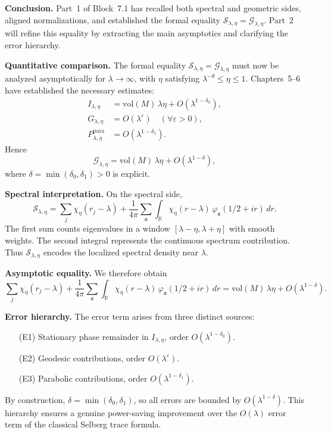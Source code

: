 \medskip

\noindent\textbf{Conclusion.}
Part~1 of Block~7.1 has recalled both spectral and geometric sides, aligned normalizations, and established the formal equality $\mathcal{S}_{\lambda,\eta}=\mathcal{G}_{\lambda,\eta}$.  
Part~2 will refine this equality by extracting the main asymptotics and clarifying the error hierarchy.



\noindent\textbf{Quantitative comparison.}
The formal equality $\mathcal{S}_{\lambda,\eta}=\mathcal{G}_{\lambda,\eta}$ must now be analyzed asymptotically for $\lambda\to\infty$, with $\eta$ satisfying $\lambda^{-\theta}\leq\eta\leq 1$.  
Chapters~5–6 have established the necessary estimates:
\begin{align*}
  I_{\lambda,\eta} &= \mathrm{vol}(M)\,\lambda\eta + O(\lambda^{1-\delta_0}), \\
  G_{\lambda,\eta} &= O(\lambda^\varepsilon) \quad (\forall \varepsilon>0), \\
  P_{\lambda,\eta}^{\mathrm{para}} &= O(\lambda^{1-\delta_1}).
\end{align*}
Hence
\[
  \mathcal{G}_{\lambda,\eta}
  = \mathrm{vol}(M)\,\lambda\eta + O(\lambda^{1-\delta}),
\]
where $\delta=\min(\delta_0,\delta_1)>0$ is explicit.

\medskip

\noindent\textbf{Spectral interpretation.}
On the spectral side,
\[
  \mathcal{S}_{\lambda,\eta} = \sum_j \chi_\eta(r_j-\lambda) + \frac{1}{4\pi}\sum_{\mathfrak{a}}\int_{\mathbb{R}} \chi_\eta(r-\lambda)\,\varphi_\mathfrak{a}(1/2+ir)\, dr.
\]
The first sum counts eigenvalues in a window $[\lambda-\eta,\lambda+\eta]$ with smooth weights.  
The second integral represents the continuous spectrum contribution.  
Thus $\mathcal{S}_{\lambda,\eta}$ encodes the localized spectral density near $\lambda$.

\medskip

\noindent\textbf{Asymptotic equality.}
We therefore obtain
\[
  \sum_j \chi_\eta(r_j-\lambda) + \frac{1}{4\pi}\sum_{\mathfrak{a}}\int_{\mathbb{R}} \chi_\eta(r-\lambda)\,\varphi_\mathfrak{a}(1/2+ir)\, dr
  = \mathrm{vol}(M)\,\lambda\eta + O(\lambda^{1-\delta}).
\]

\medskip

\noindent\textbf{Error hierarchy.}
The error term arises from three distinct sources:
\begin{itemize}
  \item[(E1)] Stationary phase remainder in $I_{\lambda,\eta}$, order $O(\lambda^{1-\delta_0})$.
  \item[(E2)] Geodesic contributions, order $O(\lambda^\varepsilon)$.
  \item[(E3)] Parabolic contributions, order $O(\lambda^{1-\delta_1})$.
\end{itemize}
By construction, $\delta=\min(\delta_0,\delta_1)$, so all errors are bounded by $O(\lambda^{1-\delta})$.  
This hierarchy ensures a genuine power-saving improvement over the $O(\lambda)$ error term of the classical Selberg trace formula.

